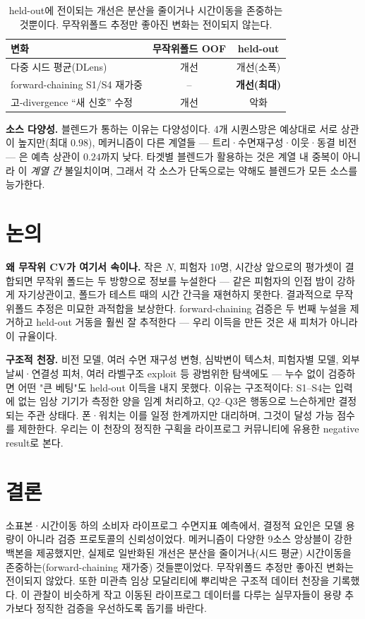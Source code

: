 \documentclass[conference]{IEEEtran}
\begin{document}
\begin{table}[t]
\caption{held-out에 전이되는 개선은 분산을 줄이거나 시간이동을 존중하는 것뿐이다. 무작위폴드 추정만
좋아진 변화는 전이되지 않는다.}
\label{tab:transfer}
\centering
\small
\begin{tabular}{@{}lcc@{}}
\toprule
변화 & 무작위폴드 OOF & held-out \\
\midrule
다중 시드 평균(DLens)        & 개선 & 개선(소폭) \\
forward-chaining S1/S4 재가중 & --   & \textbf{개선(최대)} \\
고-divergence ``새 신호'' 수정 & 개선 & 악화 \\
\bottomrule
\end{tabular}
\end{table}

\textbf{소스 다양성.} 블렌드가 통하는 이유는 다양성이다. 4개 시퀀스망은 예상대로 서로 상관이 높지만(최대
$0.98$), 메커니즘이 다른 계열들 — 트리·수면재구성·이웃·동결 비전 — 은 예측 상관이 $0.24$까지 낮다.
타겟별 블렌드가 활용하는 것은 계열 내 중복이 아니라 이 \emph{계열 간} 불일치이며, 그래서 각 소스가
단독으로는 약해도 블렌드가 모든 소스를 능가한다.

\section{논의}
\label{sec:disc}

\textbf{왜 무작위 CV가 여기서 속이나.} 작은 $N$, 피험자 10명, 시간상 앞으로의 평가셋이 결합되면 무작위
폴드는 두 방향으로 정보를 누설한다 — 같은 피험자의 인접 밤이 강하게 자기상관이고, 폴드가 테스트 때의 시간
간극을 재현하지 못한다. 결과적으로 무작위폴드 추정은 미묘한 과적합을 보상한다. forward-chaining 검증은 두
번째 누설을 제거하고 held-out 거동을 훨씬 잘 추적한다 — 우리 이득을 만든 것은 새 피처가 아니라 이 규율이다.

\textbf{구조적 천장.} 비전 모델, 여러 수면 재구성 변형, 심박변이 텍스처, 피험자별 모델, 외부 날씨·연결성
피처, 여러 라벨구조 exploit 등 광범위한 탐색에도 — 누수 없이 검증하면 어떤 "큰 베팅"도 held-out 이득을
내지 못했다. 이유는 구조적이다: S1--S4는 입력에 없는 임상 기기가 측정한 양을 임계 처리하고, Q2--Q3은
행동으로 느슨하게만 결정되는 주관 상태다. 폰·워치는 이를 일정 한계까지만 대리하며, 그것이 달성 가능 점수를
제한한다. 우리는 이 천장의 정직한 구획을 라이프로그 커뮤니티에 유용한 negative result로 본다.

\section{결론}
\label{sec:conc}
소표본·시간이동 하의 소비자 라이프로그 수면지표 예측에서, 결정적 요인은 모델 용량이 아니라 검증 프로토콜의
신뢰성이었다. 메커니즘이 다양한 9소스 앙상블이 강한 백본을 제공했지만, 실제로 일반화된 개선은 분산을
줄이거나(시드 평균) 시간이동을 존중하는(forward-chaining 재가중) 것들뿐이었다. 무작위폴드 추정만 좋아진
변화는 전이되지 않았다. 또한 미관측 임상 모달리티에 뿌리박은 구조적 데이터 천장을 기록했다. 이 관찰이
비슷하게 작고 이동된 라이프로그 데이터를 다루는 실무자들이 용량 추가보다 정직한 검증을 우선하도록 돕기를
바란다.
\end{document}
